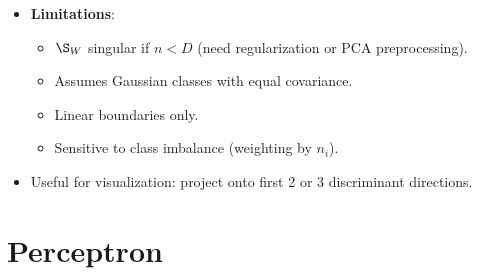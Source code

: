 \begin{itemize}
\begin{enumerate}
        \item Solve $\S_B\w=\lambda\S_W\w$.
        \item Select top $K-1$ eigenvectors.
        \item Form $\W$ and project data.
    \end{enumerate}
    \item \textbf{Limitations}:
    \begin{itemize}
        \item $\S_W$ singular if $n < D$ (need regularization or PCA preprocessing).
        \item Assumes Gaussian classes with equal covariance.
        \item Linear boundaries only.
        \item Sensitive to class imbalance (weighting by $n_i$).
    \end{itemize}
    \item Useful for visualization: project onto first 2 or 3 discriminant directions.
\end{itemize}

\section*{Perceptron}

